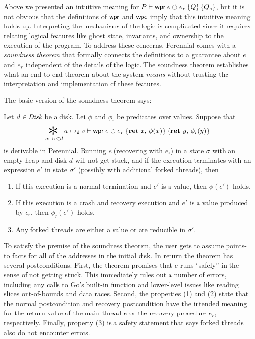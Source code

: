 Above we presented an intuitive meaning for $P \proves \wpr{e}{e_{r}}{Q}{Q_{c}}$, but it is
not obvious that the definitions of $\textsf{\upshape wpr}$ and $\textsf{\upshape wpc}$ imply that this
intuitive meaning holds up. Interpreting the mechanisms of the logic is
complicated since it requires relating logical features like ghost state,
invariants, and ownership to the execution of the program. To address these
concerns, Perennial comes with a \emph{soundness theorem} that formally connects
the definitions to a guarantee about $e$ and $e_{r}$ independent of the details
of the logic. The soundness theorem establishes what an end-to-end theorem about
the system \emph{means} without trusting the interpretation and implementation
of these features.

The basic version of the soundness theorem says:

\newcommand{\bigast}{\mathop{\scalebox{3}{\raisebox{-0.3ex}{$\ast$}}}}

\begin{theorem}
\label{thm:soundness}
  Let $d \in \textit{Disk}$ be a disk. Let $\phi$ and $\phi_r$ be predicates over
  values.
  Suppose that
  \[\bigast\limits_{a \mapsto v \in d} a \dmapsto v \proves
  \wpr{e}{e_r}{\Ret{x} \phi(x)}{\Ret{y} \phi_{r}(y)} \] is derivable in
  Perennial. Running $e$ (recovering with $e_{r}$) in a state $\sigma$ with an
  empty heap and disk $d$ will not get stuck, and if the execution
  terminates with an expression $e'$ in state $\sigma'$ (possibly
  with additional forked threads), then
  \begin{enumerate}
    \item If this execution is a normal termination and $e'$ is a value, then
    $\phi(e')$ holds.
    \item If this execution is a crash and recovery execution and $e'$ is a
    value produced by $e_{r}$, then $\phi_{r}(e')$ holds.
    \item Any forked threads are either a value or are reducible in $\sigma'$.
  \end{enumerate}
\end{theorem}
To satisfy the premise of the soundness theorem, the user gets to assume points-to
facts for all of the addresses in the initial disk. In return the theorem has
several postconditions. First, the theorem promises
that $e$ runs ``safely'' in the sense of not getting stuck. This immediately
rules out a number of errors, including any calls to Go's built-in 
function and lower-level issues like reading slices out-of-bounds and data
races.  Second, the properties (1) and (2) state that the normal postcondition and
recovery postcondition have the intended meaning for the return value of the
main thread $e$ or the recovery procedure $e_{r}$, respectively. Finally,
property (3) is a safety statement that says forked threads also do not
encounter errors.


